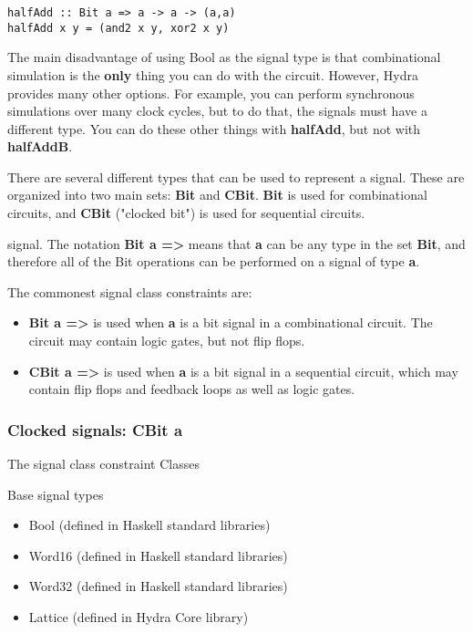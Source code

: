 \documentclass[11pt]{article}
\begin{document}
\begin{verbatim}
halfAdd :: Bit a => a -> a -> (a,a)
halfAdd x y = (and2 x y, xor2 x y)
\end{verbatim}


The main disadvantage of using Bool as the signal type is that
combinational simulation is the \textbf{only} thing you can do with the
circuit.  However, Hydra provides many other options.  For example,
you can perform synchronous simulations over many clock cycles, but to
do that, the signals must have a different type.  You can do these
other things with \textbf{halfAdd}, but not with \textbf{halfAddB}.

There are several different types that can be used to represent a
signal.  These are organized into two main sets: \textbf{Bit} and \textbf{CBit}.
\textbf{Bit} is used for combinational circuits, and \textbf{CBit} ("clocked bit")
is used for sequential circuits.

signal.  The notation \textbf{Bit a =>} means that \textbf{a} can be any type in the
set \textbf{Bit}, and therefore all of the Bit operations can be performed on
a signal of type \textbf{a}.

The commonest signal class constraints are:

\begin{itemize}
\item \textbf{Bit a =>} is used when \textbf{a} is a bit signal in a combinational
circuit.  The circuit may contain logic gates, but not flip flops.

\item \textbf{CBit a =>} is used when \textbf{a} is a bit signal in a sequential
circuit, which may contain flip flops and feedback loops as well
as logic gates.
\end{itemize}

\subsubsection{Clocked signals: CBit a}
\label{sec:orgb0a6398}

The signal class constraint 
Classes

Base signal types

\begin{itemize}
\item Bool    (defined in Haskell standard libraries)

\item Word16  (defined in Haskell standard libraries)

\item Word32  (defined in Haskell standard libraries)

\item Lattice (defined in Hydra Core library)
\end{itemize}
\end{document}
